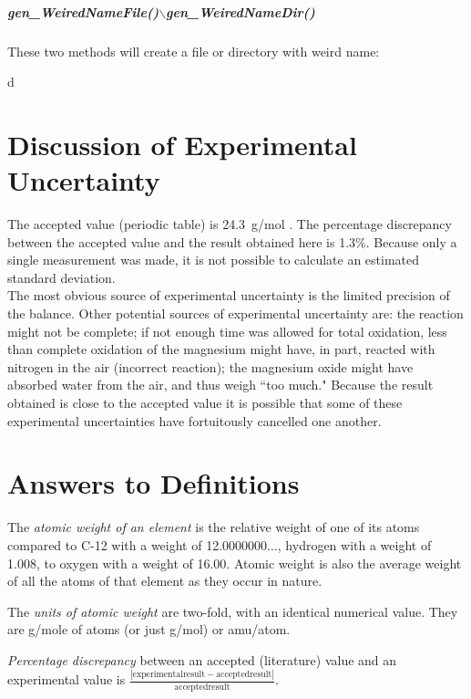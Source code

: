 \documentclass{article}
\begin{document}
\subparagraph{\bf\small\ttfamily gen\_WeiredNameFile()$\backslash$gen\_WeiredNameDir()} 
These two methods will create a file or directory with weird name:




d\\



\section{Discussion of Experimental Uncertainty}

The accepted value (periodic table) is \SI{24.3}{g/mol} \cite{Smith:2012qr}. The percentage discrepancy between the accepted value and the result obtained here is 1.3\%. Because only a single measurement was made, it is not possible to calculate an estimated standard deviation. \\

The most obvious source of experimental uncertainty is the limited precision of the balance. Other potential sources of experimental uncertainty are: the reaction might not be complete; if not enough time was allowed for total oxidation, less than complete oxidation of the magnesium might have, in part, reacted with nitrogen in the air (incorrect reaction); the magnesium oxide might have absorbed water from the air, and thus weigh ``too much." Because the result obtained is close to the accepted value it is possible that some of these experimental uncertainties have fortuitously cancelled one another.


\section{Answers to Definitions}

\begin{enumerate}
\begin{item}
The \emph{atomic weight of an element} is the relative weight of one of its atoms compared to C-12 with a weight of 12.0000000$\ldots$, hydrogen with a weight of 1.008, to oxygen with a weight of 16.00. Atomic weight is also the average weight of all the atoms of that element as they occur in nature.
\end{item}
\begin{item}
The \emph{units of atomic weight} are two-fold, with an identical numerical value. They are g/mole of atoms (or just g/mol) or amu/atom.
\end{item}
\begin{item}
\emph{Percentage discrepancy} between an accepted (literature) value and an experimental value is $\frac{|\mathrm{experimental result} - \mathrm{accepted result}|}{\mathrm{accepted result}}$.
\end{item}
\end{enumerate}
\end{document}
